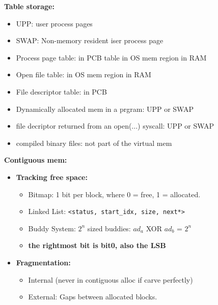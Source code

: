 \documentclass[8pt,twocolumn]{article}
\begin{document}
\textbf{Table storage:}
\vspace*{-0.8em}
\begin{itemize}
    \setlength{\itemsep}{0pt} %
    \setlength{\parskip}{0pt}
    \item UPP: user process pages
    \item SWAP: Non-memory resident iser process page 
    \item Process page table: in PCB table in OS mem region in RAM
    \item Open file table: in OS mem region in RAM
    \item File descriptor table: in PCB 
    \item Dynamically allocated mem in a prgram: UPP or SWAP
    \item file decriptor returned from an open(...) syscall: UPP or SWAP
    \item compiled binary files: not part of the virtual mem
\end{itemize}
\vspace{-0.6em}
\textbf{Contiguous mem:}
\vspace{-0.6em}
\begin{itemize}
    \setlength{\itemsep}{0pt} %
    \setlength{\parskip}{0pt}
  \item \textbf{Tracking free space:}
\vspace{-0.6em}
  \begin{itemize}
    \setlength{\itemsep}{0pt} %
    \setlength{\parskip}{0pt}
    \item Bitmap: 1 bit per block, where 0 = free, 1 = allocated.
    \item Linked List: \texttt{<status, start\_idx, size, next*>}
    \item Buddy System: $2^n$ sized buddies: $ad_a$ XOR $ad_b$ = $2^n$
    \item \textbf{the rightmost bit is bit0, also the LSB}
  \end{itemize}
\vspace{-0.6em}
  \item \textbf{Fragmentation:}
\vspace{-0.6em}
  \begin{itemize}
    \setlength{\itemsep}{0pt} %
    \setlength{\parskip}{0pt}
    \item Internal (never in contiguous alloc if carve perfectly)
    \item External: Gaps between allocated blocks.
  \end{itemize}
\vspace{-0.6em}
\end{itemize}
\end{document}
